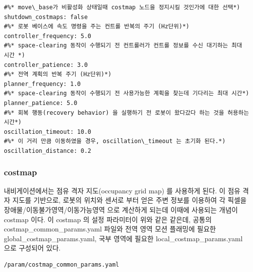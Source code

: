 \vspace{\baselineskip}
\begin{lstlisting}[language=ROS]
#%* move\_base가 비활성화 상태일때 costmap 노드을 정지시킬 것인가에 대한 선택*)
shutdown_costmaps: false
#%* 로봇 베이스에 속도 명령을 주는 컨트롤 반복의 주기 (Hz단위)*)
controller_frequency: 5.0
#%* space-clearing 동작이 수행되기 전 컨트롤러가 컨트롤 정보를 수신 대기하는 최대 시간 *)
controller_patience: 3.0 
#%* 전역 계획의 반복 주기 (Hz단위)*)
planner_frequency: 1.0
#%* space-clearing 동작이 수행되기 전 사용가능한 계획을 찾는데 기다리는 최대 시간*)
planner_patience: 5.0
#%* 회복 행동(recovery behavior) 을 실행하기 전 로봇이 왔다갔다 하는 것을 허용하는 시간*)
oscillation_timeout: 10.0
#%* 이 거리 만큼 이동하였을 경우, oscillation\_timeout 는 초기화 된다.*)
oscillation_distance: 0.2
\end{lstlisting}

\subsubsection{costmap}
내비게이션에서는  점유 격자 지도(occupancy grid map) 를 사용하게 된다. 이 점유 격자 지도를 기반으로, 로봇의 위치와 센서로 부터 얻은 주변 정보를 이용하여 각 픽셀을 장애물/이동불가영역/이동가능영역 으로 계산하게 되는데 이때에 사용되는 개념이 costmap 이다. 이 costmap 의 설정 파라미터이 위와 같은 같은데, 공통의 costmap\_common\_params.yaml 파일와 전역 영역 모션 플래밍에 필요한 global\_costmap\_params.yaml, 국부 영역에 필요한 local\_costmap\_params.yaml 으로 구성되어 있다.

\vspace{\baselineskip}
\begin{lstlisting}[language=ROS]
/param/costmap_common_params.yaml
\end{lstlisting}

